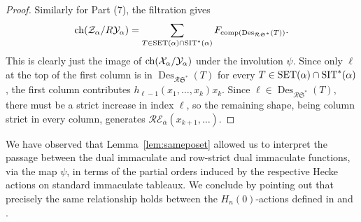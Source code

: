 \documentclass[12pt,letterpaper]{amsart}
\theoremstyle{definition}
\DeclareMathOperator{\comp}{comp}
\newcommand{\rdI}{\mathcal{R}\mathfrak{S}^*}
\DeclareMathOperator{\Des}{Des}
\newcommand{\SET}{\ensuremath{\operatorname{SET}}} \newcommand{\NSET}{\ensuremath{\operatorname{NSET}}}\newcommand{\SRCT}{\ensuremath{\operatorname{SRCT}}}
\newcommand{\hn}{H_n(0)}
\begin{document}
\begin{proof}
Similarly for Part (7), the filtration  gives 
\[\chr(\mathcal{Z}_\alpha/R\mathcal{Y}_\alpha)=\sum_{T\in \SET(\alpha)\cap\SIT^*(\alpha)} F_{\comp(\Des_{\rdI}(T))}.\]
This is clearly just the image  of $\operatorname{\mathrm{ch}}(\mathcal{X}_\alpha/\mathcal{Y}_\alpha)$ under the involution $\psi$.
Since only $\ell$ at the top of the first column is in $\Des_{\rdI}(T)$ for every $T\in \SET(\alpha)\cap\SIT^*(\alpha)$,  the first column  contributes  $h_{\ell-1}(x_1,\ldots, x_k)x_k$.  Since $\ell \in \Des_{\rdI}(T)$, there must be a strict increase in index $\ell$, so the remaining shape, being column strict in every column, generates $\mathcal{R}\mathcal{E}_{\overline{\alpha}}(x_{k+1},\ldots)$.
\end{proof}

We have observed that Lemma~\ref{lem:sameposet} allowed us to interpret the passage between the dual immaculate and row-strict dual immaculate functions, via the map $\psi$, in terms  of the partial orders induced by the respective Hecke actions on standard immaculate tableaux.  We conclude by pointing out that precisely the same relationship holds between the $\hn$-actions defined in \cite{TvW2015} and \cite{BS2021}.
\end{document}

